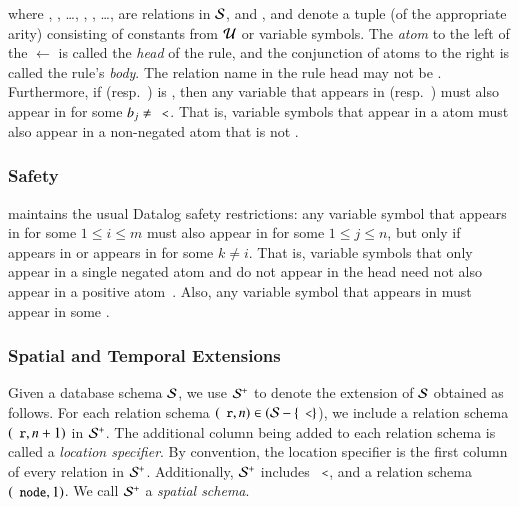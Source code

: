 \noindent where , , \ldots, ,
, \ldots,  are relations in $\schema$, and ,
 and  denote a tuple (of the appropriate arity)
consisting of constants from $\univ$ or variable symbols.  The {\em atom} to the
left of the $\leftarrow$ is called the {\em head} of the rule, and the
conjunction of atoms to the right is called the rule's {\em body}.
The relation name in the rule head may not be \dedalus{<}. Furthermore, if
 (resp.\ ) is \dedalus{<}, then any variable
that appears in  (resp.\ ) must
also appear in  for some $b_j \neq \dedalus{<}$. That is,
variable symbols that appear in a \dedalus{<} atom must also appear in a
non-negated atom that is not \dedalus{<}.

\subsubsection{Safety}
\lang maintains the usual Datalog safety restrictions: any variable symbol
 that appears in  for some $1 \leq i \leq m$ must also
appear in  for some $1 \leq j \leq n$, but only if 
appears in  or  appears in  for some $k \neq
i$. That is, variable symbols that only appear in a single negated atom and do not
appear in the head need not also appear in a positive atom~\cite{ullmanbook}.
Also, any variable symbol that appears in  must appear in some
.

\subsubsection{Spatial and Temporal Extensions}

Given a database schema $\schema$, we use $\sschema$ to denote the extension of $\schema$
obtained as follows. For each relation schema $(\dedalus{r}, n) \in (\schema-\{\dedalus{<}\}$), we include a relation schema $(\dedalus{r}, n+1)$ in $\sschema$. The
additional column being added to each relation schema is called a {\em location specifier}. By convention, the
location specifier is the first column of every relation in $\sschema$.
Additionally, $\sschema$ includes $\dedalus{<}$, and a relation schema $(\dedalus{node},1)$.
We call $\sschema$ a {\em spatial schema}.

